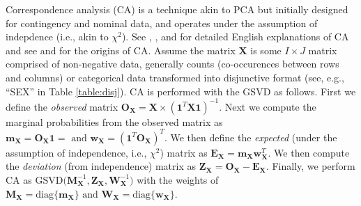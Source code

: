 \documentclass[12pt]{article}
\begin{document}
Correspondence analysis (CA) is a technique akin to PCA but initially
designed for contingency and nominal data, and operates under the
assumption of indepdence (i.e., akin to \(\chi^2\)). See
\citet{greenacre_theory_1984}, \citet{greenacre_correspondence_2010-1},
and \citet{lebart_multivariate_1984} for detailed English explanations
of CA and see \citet{escofier-cordier_analyse_1965} and
\citet{benzecri_analyse_1973} for the origins of CA. Assume the matrix
\({\mathbf X}\) is some \(I \times J\) matrix comprised of non-negative
data, generally counts (co-occurences between rows and columns) or
categorical data transformed into disjunctive format (see, e.g., ``SEX''
in Table \ref{table:disj}). CA is performed with the GSVD as follows.
First we define the \emph{observed} matrix
\({\mathbf O}_{\mathbf X} = {\mathbf X} \times ({\mathbf 1}^{T}{\mathbf X} {\mathbf 1})^{-1}\).
Next we compute the marginal probabilities from the observed matrix as
\({\mathbf m}_{\mathbf X} = {\mathbf O}_{\mathbf X}{\mathbf 1} = \text{ and } {\mathbf w}_{\mathbf X} = ({\mathbf 1}^{T}{\mathbf O}_{\mathbf X})^{T}\).
We then define the \emph{expected} (under the assumption of
independence, i.e., \(\chi^2\)) matrix as
\({\mathbf E}_{\mathbf X} = {\mathbf m}_{\mathbf X}{\mathbf w}_{\mathbf X}^{T}\).
We then compute the \emph{deviation} (from independence) matrix as
\({\mathbf Z}_{\mathbf X} = {\mathbf O}_{\mathbf X} - {\mathbf E}_{\mathbf X}\).
Finally, we perform CA as
\(\mathrm{GSVD(} {\mathbf M}_{\mathbf X}^{-1}, {\mathbf Z}_{\mathbf X}, {\mathbf W}_{\mathbf X}^{-1} \mathrm{)}\)
with the weights of
\({\mathbf M}_{\mathbf X} = \mathrm{diag\{} {\mathbf m}_{\mathbf X} \mathrm{\}} \text{ and } {\mathbf W}_{\mathbf X} = \mathrm{diag\{} {\mathbf w}_{\mathbf X} \mathrm{\}}\).
\end{document}
